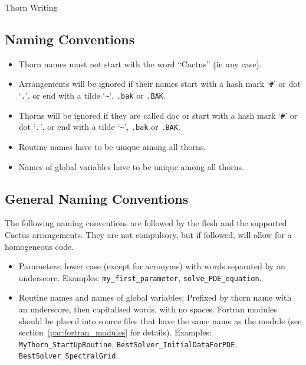 \begin{cactuspart}{Thorn Writing}
\subsection{Naming Conventions}

\begin{itemize}

\item{} Thorn names must not start with the word ``Cactus'' (in
        any case).
\item{} Arrangements will be ignored if their names start with a
        hash mark `\texttt{\#}' or dot `\texttt{.}',
        or end with a tilde `\texttt{\~{}}', \texttt{.bak} or \texttt{.BAK}.
\item{} Thorns will be ignored if they are called doc or start with a
        hash mark `\texttt{\#}' or dot `\texttt{.}',
        or end with a tilde `\texttt{\~{}}', \texttt{.bak} or \texttt{.BAK}.
\item{} Routine names have to be unique among all thorns.
\item{} Names of global variables have to be unique among all thorns.

\end{itemize}


\subsection{General Naming Conventions}

The following naming conventions are followed by the flesh and the
supported Cactus arrangements. They are not compulsory, but if followed, will
allow for a homogeneous code.

\begin{itemize}

\item Parameters: lower case (except for acronyms) with words separated
  by an underscore. Examples: \texttt{my\_first\_parameter},
  \texttt{solve\_PDE\_equation}.

\item Routine names and names of global variables: Prefixed by thorn name with
    an underscore, then capitalised words, with no spaces. Fortran modules
    should be placed into source files that have the same name as the module
    (see section~\ref{par:fortran_modules} for details).
    Examples: \texttt{MyThorn\_StartUpRoutine}, \texttt{BestSolver\_InitialDataForPDE},
    \texttt{BestSolver\_SpectralGrid}.


\end{itemize}
\end{cactuspart}
